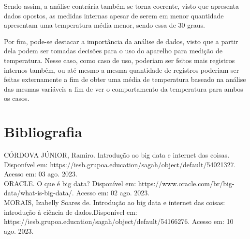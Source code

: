 \documentclass[a4paper, 12pt]{article}
\begin{document}
Sendo assim, a análise contrária também se torna coerente, visto que apresenta dados opostos, as medidas internas apesar de serem em menor quantidade apresentam uma temperatura média menor, sendo essa de 30 graus.

Por fim, pode-se destacar a importância da análise de dados, visto que a partir dela podem ser tomadas decisões para o uso do aparelho para medição de temperatura. Nesse caso, como caso de uso, poderiam ser feitos mais registros internos também, ou até mesmo a mesma quantidade de registros poderiam ser feitas externamente a fim de obter uma média de temperatura baseado na análise das mesmas variáveis a fim de ver o comportamento da temperatura para ambos os casos.

\section*{Bibliografia}
\footnotesize{

\noindent CÓRDOVA JÚNIOR, Ramiro. Introdução ao big data e internet das coisas. Disponível em: https://iesb.grupoa.education/sagah/object/default/54021327. Acesso em: 03 ago. 2023.\\

\noindent  ORACLE. O que é big data? Disponível em: https://www.oracle.com/br/big-data/what-is-big-data/. Acesso em: 02 ago. 2023.\\

\noindent MORAIS, Izabelly Soares de. Introdução ao big data e internet das coisas: introdução à ciência de dados.Disponível em: https://iesb.grupoa.education/sagah/object/default/54166276. Acesso em: 10 ago. 2023.\\
}
\end{document}
